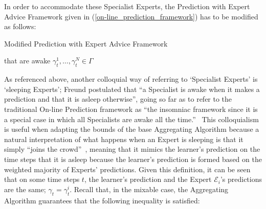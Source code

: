 In order to accommodate these Specialist Experts, the Prediction with Expert Advice Framework given in (\ref{on-line_prediction_framework}) has to be modified as follows:
\begin{protocol}[H]
    \caption{Modified Prediction with Expert Advice Framework}\label{protocol:modified_prediction_with_expert_advice}
    \begin{algorithmic}[1]
         that are awake
        $\gamma^1_t, \ldots, \gamma^N_t \in \Gamma$
    \end{algorithmic}
\end{protocol}

As referenced above, another colloquial way of referring to `Specialist Experts' is `sleeping Experts'; Freund postulated that ``a Specialist is awake when it makes a prediction and that it is asleep otherwise'', going so far as to refer to the traditional On-line Prediction framework as ``the insomniac framework since it is a special case in which all Specialists are awake all the time.''~\cite{freund:1997} This colloquialism is useful when adapting the bounds of the base Aggregating Algorithm because a natural interpretation of what happens when an Expert is sleeping is that it simply ``joins the crowd''~\cite{kalnishkan:2022}, meaning that it mimics the learner's prediction on the time steps that it is asleep because the learner's prediction is formed based on the weighted majority of Experts' predictions. Given this definition, it can be seen that on some time steps $t$, the learner's prediction and the Expert $\mathcal{E}_i$'s predictions are the same; $\gamma_t = \gamma_t^i$.
Recall that, in the mixable case, the Aggregating Algorithm guarantees that the following inequality is satisfied:

